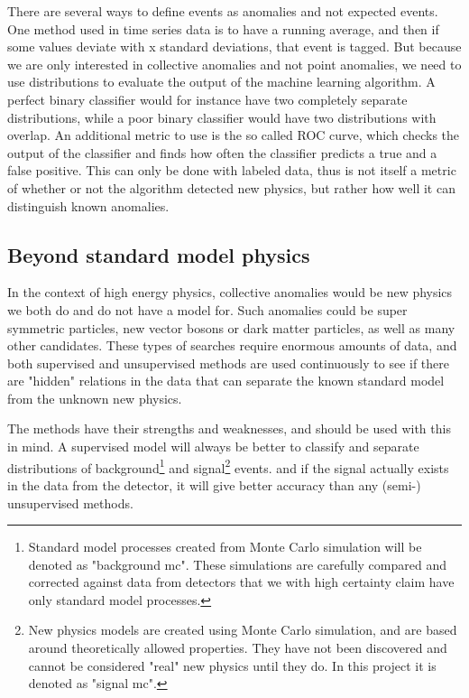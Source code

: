 \documentclass[ reprint, amsmath,amssymb, aps, nofootinbib]{revtex4-2}
\begin{document}
There are several ways to define events as anomalies and not expected events. One method used in time series data is to have a running average, and then if some values deviate with x standard deviations, that event is tagged. But because we are only interested in collective anomalies and not point anomalies, we need to use distributions to evaluate the output of the machine learning algorithm. A perfect binary classifier would for instance have two completely separate distributions, while a poor binary classifier would have two distributions with overlap. An additional metric to use is the so called ROC curve, which checks the output of the classifier and finds how often the classifier predicts a true and a false positive. This can only be done with labeled data, thus is not itself a metric of whether or not the algorithm detected new physics, but rather how well it can distinguish known anomalies.

\subsection{Beyond standard model physics}



In the context of high energy physics, collective anomalies would be new physics we both do and do not have a model for.
Such anomalies could be super symmetric particles\cite{JMLR:v18:16-558}, new vector bosons or dark matter particles, as well as many other candidates. These types of searches require enormous amounts of data, and both supervised and unsupervised methods are used continuously to see if there are "hidden" relations in the data that can separate the known standard model from the unknown new physics. \par 

The methods have their strengths and weaknesses, and should be used with this in mind. A supervised model will always be better to classify and separate distributions of background\footnote{Standard model processes created from Monte Carlo simulation will be denoted as "background mc". These simulations are carefully compared and corrected against data from detectors that we with high certainty claim have only standard model processes.} and signal\footnote{New physics models are created using Monte Carlo simulation, and are based around theoretically allowed properties. They have not been discovered and cannot be considered "real" new physics until they do. In this project it is denoted as "signal mc".} events. and if the signal actually exists in the data from the detector, it will give better accuracy than any (semi-) unsupervised methods. \par 
\end{document}
